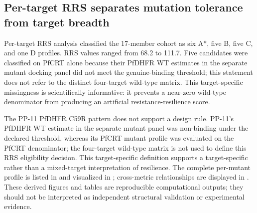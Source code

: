 \documentclass[journal=jcisd8,manuscript=article]{achemso}
\begin{document}
\subsection{Per-target RRS separates mutation tolerance from target breadth}
Per-target RRS analysis classified the 17-member cohort as six A*, five B, five C, and one D profiles. RRS values ranged from \num{68.2} to \num{111.7}. Five candidates were classified on PfCRT alone because their PfDHFR WT estimates in the separate mutant docking panel did not meet the genuine-binding threshold; this statement does not refer to the distinct four-target wild-type matrix. This target-specific missingness is scientifically informative: it prevents a near-zero wild-type denominator from producing an artificial resistance-resilience score.

The PP-11 PfDHFR C59R pattern does not support a design rule. PP-11's PfDHFR WT estimate in the separate mutant panel was non-binding under the declared threshold, whereas its PfCRT mutant profile was evaluated on the PfCRT denominator; the four-target wild-type matrix is not used to define this RRS eligibility decision. This target-specific definition supports a target-specific rather than a mixed-target interpretation of resilience. The complete per-mutant profile is listed in  and visualized in ; cross-metric relationships are displayed in . These derived figures and tables are reproducible computational outputs; they should not be interpreted as independent structural validation or experimental evidence.
\end{document}
